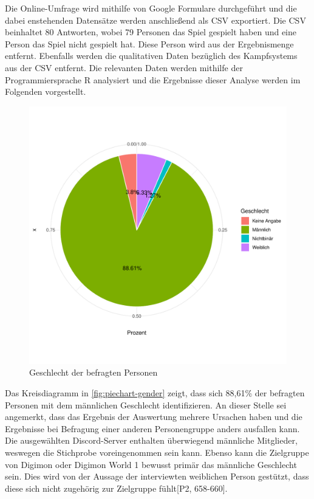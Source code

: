 Die Online-Umfrage wird mithilfe von Google Formulare\cite{google-forms} durchgeführt und die dabei enstehenden Datensätze werden anschließend als \ac{CSV} exportiert.
Die \ac{CSV} beinhaltet 80 Antworten, wobei 79 Personen das Spiel gespielt haben und eine Person das Spiel nicht gespielt hat.
Diese Person wird aus der Ergebnismenge entfernt.
Ebenfalls werden die qualitativen Daten bezüglich des Kampfsystems aus der \ac{CSV} entfernt.
Die relevanten Daten werden mithilfe der Programmiersprache R\cite{r-project} analysiert und die Ergebnisse dieser Analyse werden im Folgenden vorgestellt. \\

\begin{figure}[H]
  \centering
  \includegraphics[width=0.7\columnwidth]{figures/plots/gender.pdf}
  \caption{\label{fig:piechart-gender} Geschlecht der befragten Personen}
\end{figure}

Das Kreisdiagramm in \autoref{fig:piechart-gender} zeigt, dass sich 88,61\% der befragten Personen mit dem männlichen Geschlecht identifizieren.
An dieser Stelle sei angemerkt, dass das Ergebnis der Auswertung mehrere Ursachen haben und die Ergebnisse bei Befragung einer anderen Personengruppe anders ausfallen kann.
Die ausgewählten Discord-Server enthalten überwiegend männliche Mitglieder, weswegen die Stichprobe voreingenommen sein kann.
Ebenso kann die Zielgruppe von Digimon oder Digimon World 1 bewusst primär das männliche Geschlecht sein.
Dies wird von der Aussage der interviewten weiblichen Person gestützt, dass diese sich nicht zugehörig zur Zielgruppe fühlt[P2, 658-660].\\

